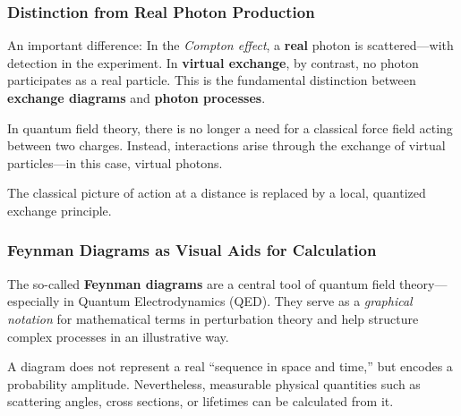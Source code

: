 \subsubsection*{Distinction from Real Photon Production}
An important difference: In the \emph{Compton effect}, a \textbf{real} photon is scattered—with detection in the experiment. In \textbf{virtual exchange}, by contrast, no photon participates as a real particle. This is the fundamental distinction between \textbf{exchange diagrams} and \textbf{photon processes}.

\vspace{1em}
\begin{tcolorbox}[didaktikbox, title=No Need for an “Invisible Force”]
	\label{box:unsichtbare Kraft}
	In quantum field theory, there is no longer a need for a classical force field acting between two charges. Instead, interactions arise through the exchange of virtual particles—in this case, virtual photons.
	
	The classical picture of action at a distance is replaced by a local, quantized exchange principle.
\end{tcolorbox}
\newpage
\noindent
\subsubsection{Feynman Diagrams as Visual Aids for Calculation}

The so-called \textbf{Feynman diagrams} are a central tool of quantum field theory—especially in Quantum Electrodynamics (QED). They serve as a \emph{graphical notation} for mathematical terms in perturbation theory and help structure complex processes in an illustrative way.

A diagram does not represent a real “sequence in space and time,” but encodes a probability amplitude. Nevertheless, measurable physical quantities such as scattering angles, cross sections, or lifetimes can be calculated from it.

